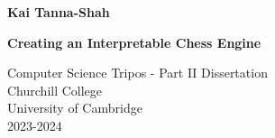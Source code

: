 \begin{titlepage}
    \large
    \null\hfill \textbf{Kai Tanna-Shah}
    \begin{center}
        \vspace*{7cm}
            
        \Huge
        \textbf{Creating an Interpretable Chess Engine}
            
            
        \vspace{5.5cm}
            
            
        \LARGE
            
        Computer Science Tripos - Part II Dissertation\\
        \vspace*{0.5cm}
        Churchill College\\
        \vspace*{0.5cm}
        University of Cambridge\\
        \vspace*{0.5cm}
        2023-2024
            
            
    \end{center}
\end{titlepage}